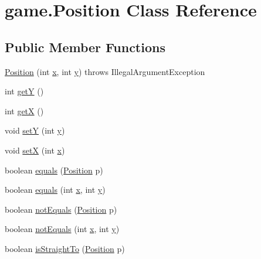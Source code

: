 \hypertarget{classgame_1_1_position}{\section{game.\-Position Class Reference}
\label{classgame_1_1_position}
}
\subsection*{Public Member Functions}
\begin{DoxyCompactItemize}
\item 
\hyperlink{classgame_1_1_position_a6d808698b920b1303255dbfd3752c624}{Position} (int \hyperlink{classgame_1_1_position_a84cd22aa467b66df4e31bf76da2fbb48}{x}, int \hyperlink{classgame_1_1_position_aa59625ace3e203e899d47f125388f751}{y})  throws Illegal\-Argument\-Exception 
\item 
int \hyperlink{classgame_1_1_position_acbd282a0971588996755cd5e93f4223f}{get\-Y} ()
\item 
int \hyperlink{classgame_1_1_position_acb39c75958db4e53de13d36d1e3e60f7}{get\-X} ()
\item 
void \hyperlink{classgame_1_1_position_a7962873f3d9c5fd080182b6e2442991a}{set\-Y} (int \hyperlink{classgame_1_1_position_aa59625ace3e203e899d47f125388f751}{y})
\item 
void \hyperlink{classgame_1_1_position_a16856b850188a64e0bc1a0fbaa8f1668}{set\-X} (int \hyperlink{classgame_1_1_position_a84cd22aa467b66df4e31bf76da2fbb48}{x})
\item 
boolean \hyperlink{classgame_1_1_position_a645c06a3b25e172c94e64aefe668c645}{equals} (\hyperlink{classgame_1_1_position}{Position} p)
\item 
boolean \hyperlink{classgame_1_1_position_ac95c086ef91c7b730fbd02afe56de54b}{equals} (int \hyperlink{classgame_1_1_position_a84cd22aa467b66df4e31bf76da2fbb48}{x}, int \hyperlink{classgame_1_1_position_aa59625ace3e203e899d47f125388f751}{y})
\item 
boolean \hyperlink{classgame_1_1_position_a07a94fb941b9afc80bbc628d6efd882f}{not\-Equals} (\hyperlink{classgame_1_1_position}{Position} p)
\item 
boolean \hyperlink{classgame_1_1_position_a354a3678f38322fbb815bcfdf1c173c0}{not\-Equals} (int \hyperlink{classgame_1_1_position_a84cd22aa467b66df4e31bf76da2fbb48}{x}, int \hyperlink{classgame_1_1_position_aa59625ace3e203e899d47f125388f751}{y})
\item 
boolean \hyperlink{classgame_1_1_position_ab082cb1ae101f75203976ec250005638}{is\-Straight\-To} (\hyperlink{classgame_1_1_position}{Position} p)

\end{DoxyCompactItemize}

